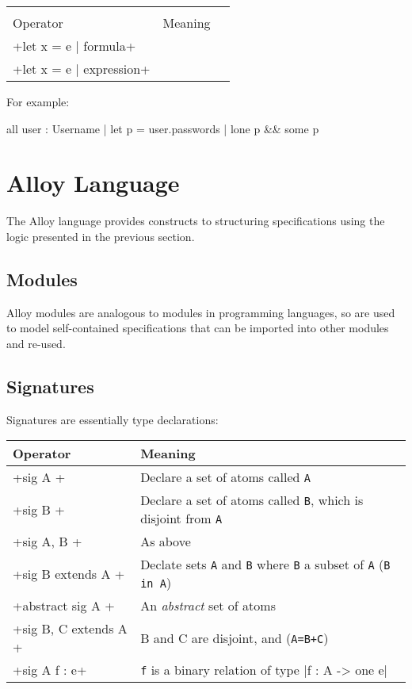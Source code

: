 \begin{center}
\begin{tabular}{lll}
\toprule
          &         \\
 Operator & Meaning \\
\midrule
 \A+let x = e | formula+\\
 \A+let x = e | expression+\\
\bottomrule
\end{tabular}
\end{center}

For example:

\begin{alloy}
all user : Username | let p = user.passwords | lone p && some p
\end{alloy}

\section{Alloy Language}

The Alloy language provides constructs to structuring specifications using the logic presented in the previous section.


\subsection{Modules}

Alloy modules are analogous to modules in programming languages, so are used to model self-contained specifications that can be imported into other modules and re-used.

\subsection{Signatures}
 
Signatures are essentially type declarations:

\begin{center}
\begin{tabular}{ll}
\toprule
 Operator & Meaning\\
\midrule
 \A+sig A {}+ & Declare a set of atoms called \texttt{A}\\
 \A+sig B {}+ & Declare a set of atoms called \texttt{B}, which is disjoint from \texttt{A}\\[3mm]
 \A+sig A, B {}+ & As above\\[3mm]
 \A+sig B extends A {}+ & Declate sets \texttt{A} and \texttt{B} where \texttt{B} a subset of \texttt{A} (\texttt{B in A})\\[3mm]
 \A+abstract sig A {}+ & An \emph{abstract} set of atoms\\
 \A+sig B, C extends A {}+ & B and C are disjoint, and (\texttt{A=B+C})\\[3mm]
 \A+sig A {f : e}+ & \texttt{f} is a binary relation of type \A|f : A -> one e| \\
\bottomrule
\end{tabular}
\end{center}



